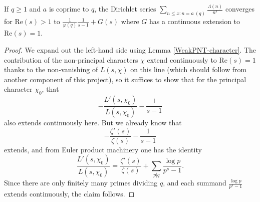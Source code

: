 \begin{proposition}
\label{WeakPNT-AP-prelim}
\leanok
If $q ≥ 1$ and $a$ is coprime to $q$, the Dirichlet series
  $\sum_{n \leq x: n = a\ (q)} \frac{\Lambda(n)}{n^s}$ converges for $\mathrm{Re}(s) > 1$ to
  $\frac{1}{\varphi(q)} \frac{1}{s-1} + G(s)$ where $G$ has a continuous extension to
  $\mathrm{Re}(s)=1$.
\end{proposition}
\begin{proof}
\leanok
We expand out the left-hand side using Lemma \ref{WeakPNT-character}.  The contribution of the
  non-principal characters $\chi$ extend continuously to $\mathrm{Re}(s) = 1$ thanks to the
  non-vanishing of $L(s,\chi)$ on this line (which should follow from another component of
  this project), so it suffices to show that for the principal character $\chi_0$, that
  $$ -\frac{L'(s,\chi_0)}{L(s,\chi_0)} - \frac{1}{s-1}$$
  also extends continuously here.  But we already know that
  $$ -\frac{\zeta'(s)}{\zeta(s)} - \frac{1}{s-1}$$
  extends, and from Euler product machinery one has the identity
  $$ \frac{L'(s,\chi_0)}{L(s,\chi_0)}
  = \frac{\zeta'(s)}{\zeta(s)} + \sum_{p|q} \frac{\log p}{p^s-1}.$$
  Since there are only finitely many primes dividing $q$, and each summand $\frac{\log p}{p^s-1}$
  extends continuously, the claim follows.
\end{proof}
